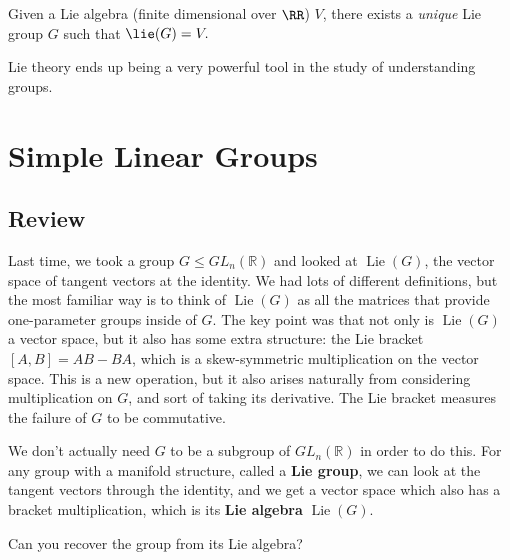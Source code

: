 \begin{theorem}
Given a Lie algebra (finite dimensional over $\RR$) $V$, there exists a \emph{unique} Lie group $G$ such that $\lie(G) = V.$
\end{theorem}

Lie theory ends up being a very powerful tool in the study of understanding groups.

\newpage


\section{Simple Linear Groups}

\subsection{Review}

Last time, we took a group $G \leq GL_n(\mathbb{R})$ and looked at $\operatorname{Lie}(G)$, the vector space of tangent vectors at the identity. We had lots of different definitions, but the most familiar way is to think of $\operatorname{Lie}(G)$ as all the matrices that provide one-parameter groups inside of $G.$ The key point was that not only is $\operatorname{Lie}(G)$ a vector space, but it also has some extra structure: the Lie bracket $[A, B] = AB - BA$, which is a skew-symmetric multiplication on the vector space. This is a new operation, but it also arises naturally from considering multiplication on $G$, and sort of taking its derivative. The Lie bracket measures the failure of $G$ to be commutative.

We don't actually need $G$ to be a subgroup of $GL_n(\mathbb{R})$ in order to do this. For any group with a manifold structure, called a \textbf{Lie group}, we can look at the tangent vectors through the identity, and we get a vector space which also has a bracket multiplication, which is its \textbf{Lie algebra} $\operatorname{Lie}(G)$. 

\begin{question}
    Can you recover the group from its Lie algebra?
\end{question}

